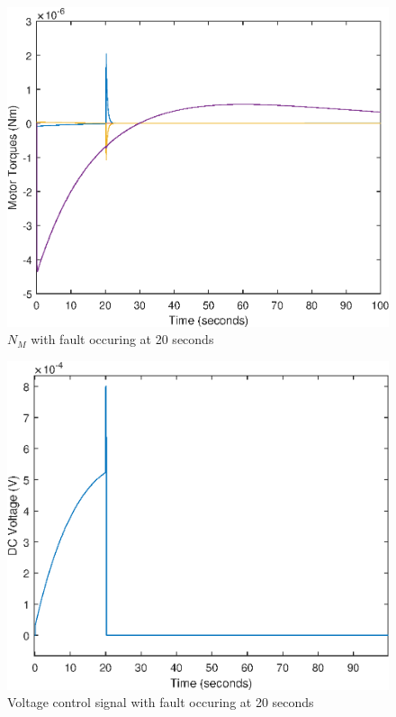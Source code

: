 \begin{figure}
	\centering
	\includegraphics[width=120mm]{figures/torque_reconfig}
	\caption{$N_M$ with fault occuring at 20 seconds}
\end{figure} 

\begin{figure}
	\centering
	\includegraphics[width=120mm]{figures/voltage_reconfig}
	\caption{Voltage control signal with fault occuring at 20 seconds}
\end{figure} 


